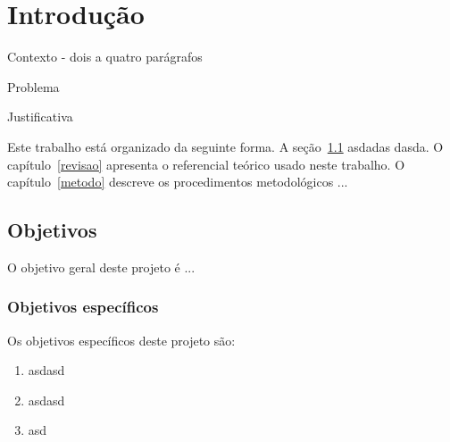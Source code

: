 \chapter{Introdução}
\label{intro}

Contexto - dois a quatro parágrafos 

Problema 

Justificativa


Este trabalho está organizado da seguinte forma. A seção~\ref{sec:Obj} asdadas  dasda. O capítulo~\ref{revisao} apresenta o referencial teórico usado neste trabalho. O capítulo~\ref{metodo} descreve os procedimentos metodológicos  ...


\section{Objetivos}
\label{sec:Obj}

O objetivo geral deste projeto é ...

\subsection{Objetivos específicos}

Os objetivos específicos deste projeto são:
\begin{enumerate}
    \item asdasd
    \item asdasd
    \item asd
\end{enumerate}
